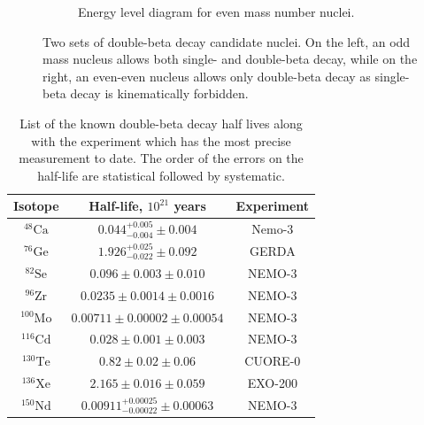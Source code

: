 \begin{figure}[htbp]
\begin{subfigure}[t]{0.40\textwidth}
\caption[Energy level diagram for even mass number nuclei.]{Energy level diagram for even mass number nuclei.}
\end{subfigure}
\caption[Two sets of double-beta decay candidate nuclei. On the left, an odd mass nucleus allows both single- and double-beta decay, while on the right, an even-even nucleus allows only double-beta decay as single-beta decay is kinematically forbidden.]{Two sets of double-beta decay candidate nuclei. On the left, an odd mass nucleus allows both single- and double-beta decay, while on the right, an even-even nucleus allows only double-beta decay as single-beta decay is kinematically forbidden.}
\label{fig:parabola_even}
\end{figure}

\begin{table}[htpb]
\centering
\begin{tabular}{|c|c|c|}
\hline
Isotope & Half-life, $10^{21}$ years & Experiment \\ \hline 
$^{48}\textrm{Ca}$ & $0.044^{+0.005}_{-0.004} \pm 0.004$ & Nemo-3 \cite{Bongrand:2011ei} \\ \hline
$^{76}\textrm{Ge}$ & $1.926^{+0.025}_{-0.022} \pm 0.092$ & GERDA \cite{Agostini:2015nwa} \\ \hline
$^{82}\textrm{Se}$ & $0.096 \pm 0.003 \pm 0.010$ & NEMO-3 \cite{Bongrand:2011ei}\\ \hline
$^{96}\textrm{Zr}$ & $0.0235 \pm 0.0014 \pm 0.0016$ & NEMO-3 \cite{Bongrand:2011ei}\\ \hline
$^{100}\textrm{Mo}$ & $0.00711 \pm 0.00002 \pm 0.00054$ & NEMO-3 \cite{Bongrand:2011ei}\\ \hline
$^{116}\textrm{Cd}$ & $0.028 \pm 0.001 \pm 0.003$ & NEMO-3 \cite{Bongrand:2011ei} \\ \hline
$^{130}\textrm{Te}$ & $0.82 \pm 0.02\pm 0.06$ & CUORE-0 \cite{Alduino:2016vtd} \\ \hline
$^{136}\textrm{Xe}$ & $2.165 \pm 0.016 \pm 0.059$ & EXO-200 \cite{Albert:2013gpz} \\ \hline
$^{150}\textrm{Nd}$ & $0.00911^{+0.00025}_{-0.00022}\pm 0.00063$ & NEMO-3 \cite{Bongrand:2011ei} \\ \hline
\end{tabular} 
\caption[List of known two-neutrino beta decay half lives.]{List of the known double-beta decay half lives along with the experiment which has the most precise measurement to date. The order of the errors on the half-life are statistical followed by systematic.}
\label{tab:2nuHalfLife}
\end{table}

